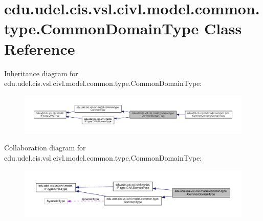\hypertarget{classedu_1_1udel_1_1cis_1_1vsl_1_1civl_1_1model_1_1common_1_1type_1_1CommonDomainType}{}\section{edu.\+udel.\+cis.\+vsl.\+civl.\+model.\+common.\+type.\+Common\+Domain\+Type Class Reference}
\label{classedu_1_1udel_1_1cis_1_1vsl_1_1civl_1_1model_1_1common_1_1type_1_1CommonDomainType}


Inheritance diagram for edu.\+udel.\+cis.\+vsl.\+civl.\+model.\+common.\+type.\+Common\+Domain\+Type\+:
\nopagebreak
\begin{figure}[H]
\begin{center}
\leavevmode
\includegraphics[width=350pt]{classedu_1_1udel_1_1cis_1_1vsl_1_1civl_1_1model_1_1common_1_1type_1_1CommonDomainType__inherit__graph}
\end{center}
\end{figure}


Collaboration diagram for edu.\+udel.\+cis.\+vsl.\+civl.\+model.\+common.\+type.\+Common\+Domain\+Type\+:
\nopagebreak
\begin{figure}[H]
\begin{center}
\leavevmode
\includegraphics[width=350pt]{classedu_1_1udel_1_1cis_1_1vsl_1_1civl_1_1model_1_1common_1_1type_1_1CommonDomainType__coll__graph}
\end{center}
\end{figure}
